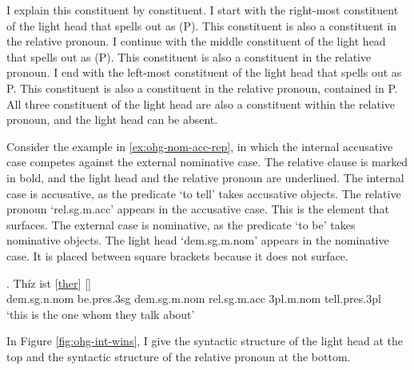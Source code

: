 I explain this constituent by constituent.
I start with the right-most constituent of the light head that spells out as  (P). This constituent is also a constituent in the relative pronoun.
I continue with the middle constituent of the light head that spells out as  (P). This constituent is also a constituent in the relative pronoun.
I end with the left-most constituent of the light head that spells out as  {P}. This constituent is also a constituent in the relative pronoun, contained in P.
All three constituent of the light head are also a constituent within the relative pronoun, and the light head can be absent.

Consider the example in \ref{ex:ohg-nom-acc-rep}, in which the internal accusative case competes against the external nominative case. The relative clause is marked in bold, and the light head and the relative pronoun are underlined.
The internal case is accusative, as the predicate  `to tell' takes accusative objects. The relative pronoun  `\ac{rel}.\ac{sg}.\ac{m}.\ac{acc}' appears in the accusative case. This is the element that surfaces.
The external case is nominative, as the predicate  `to be' takes nominative objects. The light head  `\ac{dem}.\ac{sg}.\ac{m}.\ac{nom}' appears in the nominative case. It is placed between square brackets because it does not surface.

\exg. Thíz ist [\underline{ther}] \underline[]  \\
\ac{dem}.\ac{sg}.\ac{n}.\ac{nom} be.\ac{pres}.3\ac{sg}\scsub{[nom]} \ac{dem}.\ac{sg}.\ac{m}.\ac{nom} \ac{rel}.\ac{sg}.\ac{m}.\ac{acc} 3\ac{pl}.\ac{m}.\ac{nom} tell.\ac{pres}.3\ac{pl}\scsub{[acc]}\\
`this is the one whom they talk about' \label{ex:ohg-nom-acc-rep}

In Figure \ref{fig:ohg-int-wins}, I give the syntactic structure of the light head at the top and the syntactic structure of the relative pronoun at the bottom.


